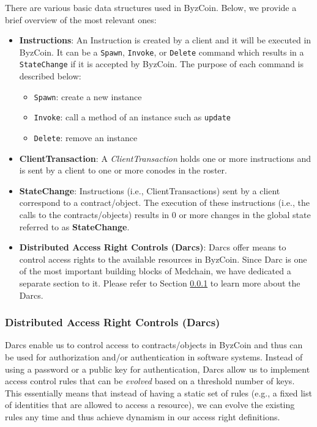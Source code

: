 There are various basic data structures used in ByzCoin. Below, we provide a brief overview of the most relevant ones:
\begin{itemize}
    \item{\textbf{Instructions}}: An Instruction is created by a client and it will be executed in ByzCoin. It can be a \texttt{Spawn}, \texttt{Invoke}, or \texttt{Delete} command which results in a \texttt{StateChange} if it is accepted by ByzCoin. The purpose of each command is described below:
    \begin{itemize}
        \item \texttt{Spawn}: create a new instance
        \item \texttt{Invoke}: call a method of an instance such as \texttt{update}
        \item \texttt{Delete}: remove an instance
    \end{itemize}
    
    \item{\textbf{ClientTransaction}}: A \textit{ClientTransaction} holds one or more instructions and is sent by a client to one or more conodes in the roster. 
    \item{\textbf{StateChange}}: Instructions (i.e., ClientTransactions) sent by a client correspond to a contract/object. The execution of these instructions (i.e., the calls to the contracts/objects) results in 0 or more changes in the global state referred to as \textbf{StateChange}. 
    \item{\textbf{Distributed Access Right Controls (Darcs)}}: Darcs offer means to control access rights to the available resources in ByzCoin. Since Darc is one of the most important building blocks of Medchain, we have dedicated a separate section to it. Please refer to Section \ref{background:darc} to learn more about the Darcs. 

\end{itemize}


\subsubsection{Distributed Access Right Controls (Darcs)}\label{background:darc}
Darcs enable us to control access to contracts/objects in ByzCoin and thus can be used for authorization and/or authentication in software systems. Instead of using a password or a public key for authentication, Darcs allow us to implement access control rules that can be \textit{evolved} based on a threshold number of keys. This essentially means that instead of having a static set of rules (e.g., a fixed list of identities that are allowed to access a resource), we can evolve the existing rules any time and thus achieve dynamism in our access right definitions.  


